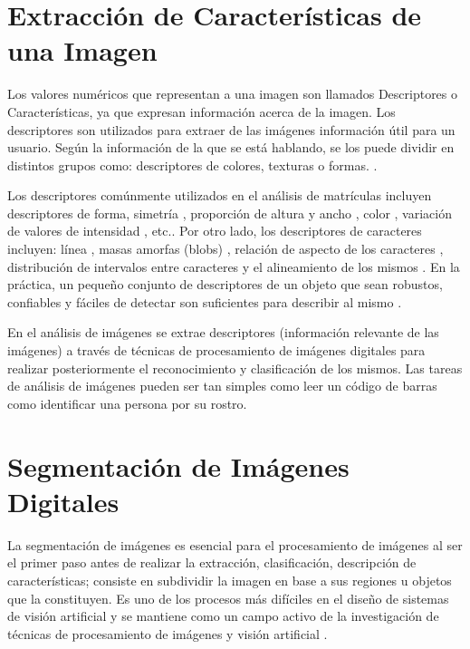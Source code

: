 \section{Extracción de Características de una Imagen}

Los valores numéricos que representan a una imagen son llamados Descriptores o Características, ya que expresan información acerca de la imagen. Los descriptores son utilizados para extraer de las imágenes información útil para un usuario. Según la información de la que se está hablando, se los puede dividir en distintos grupos como: descriptores de colores, texturas o formas. \parencite{Deselaers2008-zg}.

Los descriptores comúnmente utilizados en el análisis de matrículas incluyen descriptores de forma, simetría \parencite{Kim2001-yv}, proporción de altura y ancho \parencite{Naito2000-im}, color \parencite{Kim1996-js}, variación de valores de intensidad \parencite{Draghici1997-gz}, etc.. Por otro lado, los descriptores de caracteres incluyen: línea \parencite{Yu2000-tm}, masas amorfas (blobs) \parencite{Hontani2001-lk}, relación de aspecto de los caracteres \parencite{Hermida1997-ds}, distribución de intervalos entre caracteres \parencite{Poon1995-pw} y el alineamiento de los mismos \parencite{Soh1994-mc}. En la práctica, un pequeño conjunto de descriptores de un objeto que sean robustos, confiables y fáciles de detectar son suficientes para describir al mismo \parencite{Chang2004-kg}. 

En el análisis de imágenes se extrae descriptores (información relevante de las imágenes) a través de técnicas de procesamiento de imágenes digitales para realizar posteriormente el reconocimiento y clasificación de los mismos. Las tareas de análisis de imágenes pueden ser tan simples como leer un código de barras como identificar una persona por su rostro. \parencite{Solomon2011-xz}


\section{Segmentación de Imágenes Digitales}

La segmentación de imágenes es esencial para el procesamiento de imágenes al ser el primer paso antes de realizar la extracción, clasificación, descripción de características; consiste en subdividir la imagen en base a sus regiones u objetos que la constituyen. Es uno de los procesos más difíciles en el diseño de sistemas de visión artificial y se mantiene como un campo activo de la investigación de técnicas de procesamiento de imágenes y visión artificial \parencite{Solomon2011-xz}.

